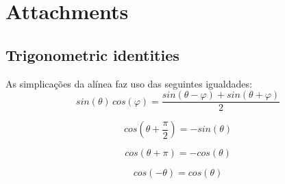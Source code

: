 \documentclass[a4paper]{article}
\begin{document}
\clearpage
\section{Attachments}
\subsection{Trigonometric identities}
\label{subsec:trigident}
\noindent As simplicações da alínea \emph{} faz uso das seguintes igualdades:
\begin{equation}
	sin(\theta) \, cos(\varphi) = \frac{sin(\theta - \varphi) + sin(\theta + \varphi)}{2}
\end{equation}

\begin{equation}
	cos\left(\theta + \frac{\pi}{2}\right) = -sin(\theta)
\end{equation}

\begin{equation}
	cos(\theta + \pi) = -cos(\theta)
\end{equation}

\begin{equation}
	cos(-\theta) = cos(\theta)
\end{equation}
\end{document}

